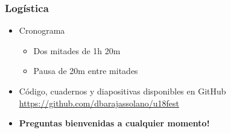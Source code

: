 \documentclass[10pt]{beamer}
\begin{document}
%
\begin{frame}
  \frametitle{Logística}
  \begin{itemize}
  \item Cronograma
    \begin{itemize}
    \item Dos mitades de 1h 20m
    \item Pausa de 20m entre mitades
    \end{itemize}
  \item Código, cuadernos y diapositivas disponibles en GitHub\\
    \url{https://github.com/dbarajassolano/u18fest}
  \item \textbf{Preguntas bienvenidas a cualquier momento!}
  \end{itemize}
\end{frame}
\end{document}
